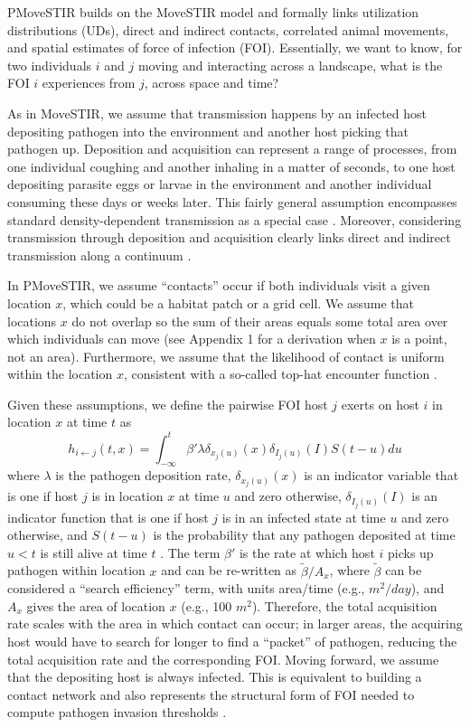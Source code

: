 \documentclass[letterpaper]{article}
\begin{document}
PMoveSTIR builds on the MoveSTIR model \citep{Wilber2022} and formally links utilization distributions (UDs), direct and indirect contacts, correlated animal movements, and spatial estimates of force of infection (FOI). Essentially, we want to know, for two individuals $i$ and $j$ moving and interacting across a landscape, what is the FOI $i$ experiences from $j$, across space and time?  

As in MoveSTIR, we assume that transmission happens by an infected host depositing pathogen into the environment and another host picking that pathogen up. 
Deposition and acquisition can represent a range of processes, from one individual coughing and another inhaling in a matter of seconds, to one host depositing parasite eggs or larvae in the environment and another individual consuming these days or weeks later. 
This fairly general assumption encompasses standard density-dependent transmission as a special case \citep{Cortez2021}. 
Moreover, considering transmission through deposition and acquisition clearly links direct and indirect transmission along a continuum \citep{Wilber2022}.

In PMoveSTIR, we assume ``contacts'' occur if both individuals visit a given location $x$, which could be a habitat patch or a grid cell. 
We assume that locations $x$ do not overlap so the sum of their areas equals some total area over which individuals can move (see Appendix 1 for a derivation when $x$ is a point, not an area). 
Furthermore, we assume that the likelihood of contact is uniform within the location $x$, consistent with a so-called top-hat encounter function \citep{Gurarie2013,Wilber2022}.

Given these assumptions, we define the pairwise FOI host $j$ exerts on host $i$ in location $x$ at time $t$ as \citep{Wilber2022}
\begin{equation}
    h_{i \leftarrow j}(t, x) = \int_{-\infty}^{t} \beta' \lambda \delta_{x_j(u)}(x) \delta_{I_j(u)}(I) S(t - u) du
    \label{eq:original_foi}
\end{equation}
where $\lambda$ is the pathogen deposition rate, $\delta_{x_j(u)}(x)$ is an indicator variable that is one if host $j$ is in location $x$ at time $u$ and zero otherwise, $\delta_{I_j(u)}(I)$ is an indicator function that is one if host $j$ is in an infected state at time $u$ and zero otherwise, and $S(t-u)$ is the probability that any pathogen deposited at time $u < t$ is still alive at time $t$ \citep[see][for a full derivation]{Wilber2022}. 
The term $\beta'$ is the rate at which host $i$ picks up pathogen within location $x$ and can be re-written as $\tilde{\beta} / A_x$, where $\tilde{\beta}$ can be considered a ``search efficiency'' term, with units area/time (e.g., $m^2 / day$), and $A_x$ gives the area of location $x$ (e.g., 100 $m^2$). 
Therefore, the total acquisition rate scales with the area in which contact can occur; in larger areas, the acquiring host would have to search for longer to find a ``packet'' of pathogen, reducing the total acquisition rate and the corresponding FOI. Moving forward, we assume that the depositing host is always infected. This is equivalent to building a contact network and also represents the structural form of FOI needed to compute pathogen invasion thresholds \citep{Wilber2022}.
\end{document}
